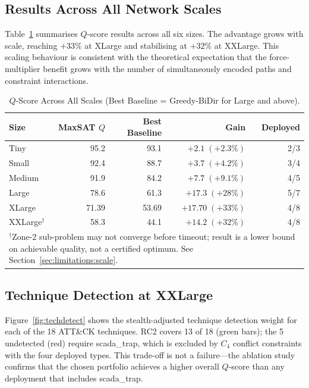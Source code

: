 \documentclass[journal]{IEEEtran}
\newcommand{\qscore}{$Q$-score}
\begin{document}
\subsection{Results Across All Network Scales}
\label{sec:results:allscales}

Table~\ref{tab:allscales} summarises \qscore{} results across all
six sizes. The advantage grows with scale, reaching $+33\%$ at
XLarge and stabilising at $+32\%$ at XXLarge. This scaling
behaviour is consistent with the theoretical expectation that the
force-multiplier benefit grows with the number of simultaneously
encoded paths and constraint interactions.

\begin{table}[t]
\caption{$Q$-Score Across All Scales (Best Baseline = Greedy-BiDir
  for Large and above).}
\label{tab:allscales}
\centering
\renewcommand{\arraystretch}{1.2}
\begin{tabular}{lrrrr}
\toprule
Size & MaxSAT $Q$ & Best Baseline & Gain & Deployed \\
\midrule
Tiny    & 95.2  & 93.1  & $+2.1\;(+2.3\%)$   & 2/3 \\
Small   & 92.4  & 88.7  & $+3.7\;(+4.2\%)$   & 3/4 \\
Medium  & 91.9  & 84.2  & $+7.7\;(+9.1\%)$   & 4/5 \\
Large   & 78.6  & 61.3  & $+17.3\;(+28\%)$   & 5/7 \\
XLarge  & 71.39 & 53.69 & $+17.70\;(+33\%)$  & 4/8 \\
XXLarge$^\dagger$ & 58.3 & 44.1 & $+14.2\;(+32\%)$ & 4/8 \\
\bottomrule
\multicolumn{5}{l}{\footnotesize $^\dagger$Zone-2 sub-problem may
  not converge before timeout; result is a lower bound on achievable
  quality, not a certified optimum. See Section~\ref{sec:limitations:scale}.}
\end{tabular}
\end{table}

\subsection{Technique Detection at XXLarge}
\label{sec:results:techdetect}

Figure~\ref{fig:techdetect} shows the stealth-adjusted technique
detection weight for each of the 18 ATT\&CK techniques. RC2 covers
13 of 18 (green bars); the 5 undetected (red) require scada\_trap,
which is excluded by $C_4$ conflict constraints with the four
deployed types. This trade-off is not a failure---the ablation study
confirms that the chosen portfolio achieves a higher overall
\qscore{} than any deployment that includes scada\_trap.
\end{document}
